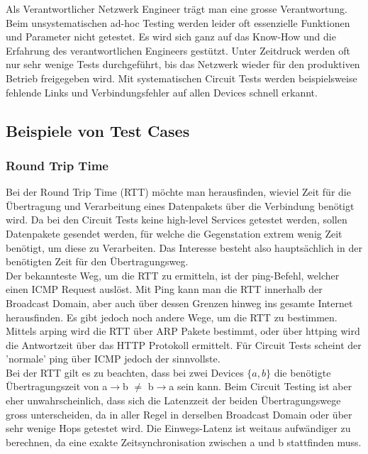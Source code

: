 \documentclass[a4,12pt]{scrartcl}
\begin{document}
\noindent Als Verantwortlicher Netzwerk Engineer trägt man eine grosse Verantwortung. Beim unsystematischen ad-hoc Testing werden leider oft essenzielle Funktionen und Parameter nicht getestet. Es wird sich ganz auf das Know-How und die Erfahrung des verantwortlichen Engineers gestützt. Unter Zeitdruck werden oft nur sehr wenige Tests durchgeführt, bis das Netzwerk wieder für den produktiven Betrieb freigegeben wird. Mit systematischen Circuit Tests werden beispielsweise fehlende Links und Verbindungsfehler auf allen Devices schnell erkannt. 
\subsection{Beispiele von Test Cases}
\subsubsection{Round Trip Time}
Bei der Round Trip Time (RTT) möchte man herausfinden, wieviel Zeit für die Übertragung und Verarbeitung eines Datenpakets über die Verbindung benötigt wird. Da bei den Circuit Tests keine high-level Services getestet werden, sollen Datenpakete gesendet werden, für welche die Gegenstation extrem wenig Zeit benötigt, um diese zu Verarbeiten. Das Interesse besteht also hauptsächlich in der benötigten Zeit für den Übertragungsweg.\\

\noindent Der bekannteste Weg, um die RTT zu ermitteln, ist der ping-Befehl, welcher einen ICMP Request auslöst. Mit Ping kann man die RTT innerhalb der Broadcast Domain, aber auch über dessen Grenzen hinweg ins gesamte Internet herausfinden. Es gibt jedoch noch andere Wege, um die RTT zu bestimmen. Mittels arping wird die RTT über ARP Pakete bestimmt, oder über httping wird die Antwortzeit über das HTTP Protokoll ermittelt. Für Circuit Tests scheint der 'normale' ping über ICMP jedoch der sinnvollste.\\

\noindent Bei der RTT gilt es zu beachten, dass bei zwei Devices $\{a,b\}$ die benötigte Übertragungszeit von a$\rightarrow$b $\neq$ b$\rightarrow$a sein kann. Beim Circuit Testing ist aber eher unwahrscheinlich, dass sich die Latenzzeit der beiden Übertragungswege gross unterscheiden, da in aller Regel in derselben Broadcast Domain oder über sehr wenige Hops getestet wird. Die Einwegs-Latenz ist weitaus aufwändiger zu berechnen, da eine exakte Zeitsynchronisation zwischen a und b stattfinden muss.\\
\end{document}
